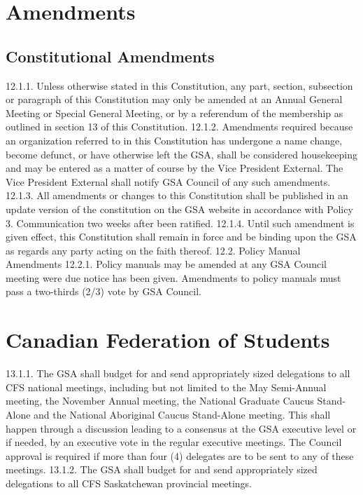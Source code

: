 \section{Amendments }
\subsection{Constitutional Amendments }
12.1.1. Unless otherwise stated in this Constitution, any part, section, 
subsection or paragraph of this Constitution may only be amended at 
an Annual General Meeting or Special General Meeting, or by a 
referendum of the membership as outlined in section 13 of this 
Constitution. 
12.1.2. Amendments required because an organization referred to in this 
Constitution has undergone a name change, become defunct, or have 
otherwise left the GSA, shall be considered housekeeping and may be 
entered as a matter of course by the Vice President External. The Vice 
President External shall notify GSA Council of any such amendments. 
12.1.3. All amendments or changes to this Constitution shall be published 
in an update version of the constitution on the GSA website in 
accordance with Policy 3. Communication two weeks after been ratified. 
12.1.4. Until such amendment is given effect, this Constitution shall 
remain in force and be binding upon the GSA as regards any party 
acting on the faith thereof. 
12.2. Policy Manual Amendments 
12.2.1. Policy manuals may be amended at any GSA Council meeting were 
due notice has been given. Amendments to policy manuals must pass a 
two-thirds (2/3) vote by GSA Council. 
\section{ Canadian Federation of Students} 
13.1.1. The GSA shall budget for and send appropriately sized delegations 
to all CFS national meetings, including but not limited to the May 
Semi-Annual meeting, the November Annual meeting, the National 
Graduate Caucus Stand-Alone and the National Aboriginal Caucus 
Stand-Alone meeting. This shall happen through a discussion leading 
to a consensus at the GSA executive level or if needed, by an 
executive vote in the regular executive meetings. The Council 
approval is required if more than four (4) delegates are to be sent to 
any of these meetings. 
13.1.2. The GSA shall budget for and send appropriately sized delegations 
to all CFS Saskatchewan provincial meetings. 
